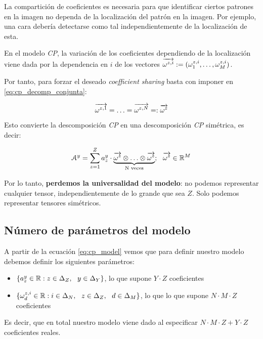 La compartición de coeficientes es necesaria para que identificar ciertos patrones en la imagen no dependa de la localización del patrón en la imagen. Por ejemplo, una cara debería detectarse como tal independientemente de la localización de esta.

En el modelo \textit{CP}, la variación de los coeficientes dependiendo de la localización viene dada por la dependencia en $i$ de los vectores $\overrightarrow{\omega^{z,i}} := (\omega^{z, i}_1, \ldots, \omega^{z, i}_M)$.

Por tanto, para forzar el deseado \textit{coefficient sharing} basta con imponer en \eqref{eq:cp_decomp_conjunta}:

\begin{equation}
	\overrightarrow{\omega^{z, 1}} = \ldots = \overrightarrow{\omega^{z, N}} =: \overrightarrow{\omega^z}
\end{equation}

Esto convierte la descomposición \textit{CP} en una descomposición \textit{CP} simétrica, es decir:

\begin{equation}
	\mathcal{A}^y = \sum_{z = 1}^Z a_z^y \cdot \underbrace{\overrightarrow{\omega^z} \otimes \ldots \otimes \overrightarrow{\omega^z}}_\textrm{N veces}; \ \  \overrightarrow{\omega^z} \in \mathbb{R}^M
\end{equation}

Por lo tanto, \textbf{perdemos la universalidad del modelo}: no podemos representar cualquier tensor, independientemente de lo grande que sea $Z$. Solo podemos representar tensores simétricos.

\subsection{Número de parámetros del modelo} \label{msubsec:parametros_modelo_cp}

A partir de la ecuación \eqref{eq:cp_model} vemos que para definir nuestro modelo debemos definir los siguientes parámetros:

\begin{itemize}
	\item $\{a_z^y \in \mathbb{R} : z \in \Delta_{Z}, \ \  y \in \Delta_{Y}\}$, lo que supone $Y \cdot Z$ coeficientes
	\item $\{\omega_d^{z, i} \in \mathbb{R}: i \in \Delta_{N}, \ \  z \in \Delta_{Z}, \ \  d \in \Delta_{M}\}$, lo que lo que supone $N \cdot M \cdot Z$ coeficientes
\end{itemize}

Es decir, que en total nuestro modelo viene dado al especificar $N \cdot M \cdot Z + Y \cdot Z$ coeficientes reales.

